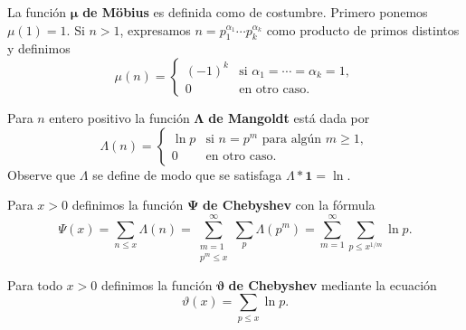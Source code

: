 La funci\'on \(\boldsymbol{\mu}\) \textbf{de M\"{o}bius} es definida como de costumbre. 
Primero ponemos \(\mu(1) = 1\).
Si \(n > 1\), expresamos \(n = p_1^{\alpha_1} \cdots p_k^{\alpha_k}\)
como producto de primos distintos y definimos
\[
  \mu(n) = 
  \begin{cases}
    (-1)^k &\text{si } \alpha_1 = \cdots = \alpha_k = 1, \\
    0 &\text{en otro caso}. 
  \end{cases}
\]

Para \(n\) entero positivo la funci\'on
\(\boldsymbol{\Lambda}\) \textbf{de Mangoldt} est\'a dada por 
\[
  \Lambda(n) =
  \begin{cases}
    \ln p &\text{si } n = p^m \text{ para alg\'un } m \geq 1,\\
    0 &\text{en otro caso.}
  \end{cases}
\]
Observe que \(\Lambda\) se define de modo que se satisfaga
\(\Lambda * \textbf{1} = \ln\).

Para \(x > 0\) definimos la funci\'on
\(\boldsymbol{\Psi}\) \textbf{de Chebyshev} con la f\'ormula
\[
  \Psi(x)
  = \sum_{n \leq x} \Lambda(n) 
  = \sum_{\substack{m = 1\\p^m \leq x}}^\infty \sum_p \Lambda(p^m)
  = \sum_{m = 1}^\infty \sum_{p \leq x^{1/m}} \ln p.
\]

Para todo \(x > 0\) definimos la funci\'on \(\boldsymbol{\vartheta}\)
\textbf{de Chebyshev} mediante la ecuaci\'on
\[
  \vartheta(x) = \sum_{p \leq x} \ln p.
\]
